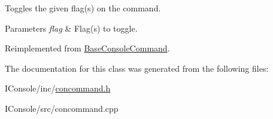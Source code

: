 Toggles the given flag(s) on the command. 


\begin{DoxyParams}{Parameters}
{\em flag} & Flag(s) to toggle. \\
\hline
\end{DoxyParams}


Reimplemented from \hyperlink{class_base_console_command_a509caa8e6fba5c10e9ff89dd5fb665cf}{Base\-Console\-Command}.



The documentation for this class was generated from the following files\-:\begin{DoxyCompactItemize}
\item 
I\-Console/inc/\hyperlink{concommand_8h}{concommand.\-h}\item 
I\-Console/src/concommand.\-cpp\end{DoxyCompactItemize}
